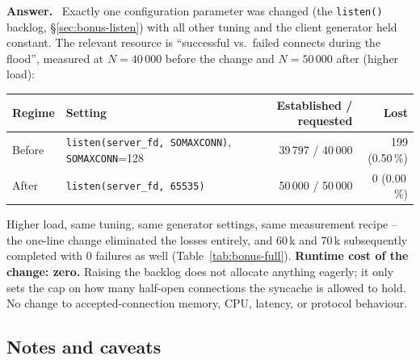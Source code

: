 \documentclass[11pt,a4paper]{article}
\newenvironment{answer}
  {\begin{answerbox}\textbf{\color{accent}Answer.}\ }
  {\end{answerbox}}
\begin{document}
\begin{answer}
Exactly one configuration parameter was changed (the \texttt{listen()}
backlog, \S\ref{sec:bonus-listen}) with all other tuning and the client
generator held constant.  The relevant resource is
``successful vs.\ failed connects during the flood'', measured at $N=40\,000$
before the change and $N=50\,000$ after (higher load):

\begin{center}
\small
\begin{tabular}{@{}llrr@{}}
\toprule
\textbf{Regime} & \textbf{Setting} & \textbf{Established / requested} & \textbf{Lost} \\ \midrule
Before & \texttt{listen(server\_fd, SOMAXCONN)}, \texttt{SOMAXCONN}=128 & 39\,797 / 40\,000 & 199 (0.50\,\%) \\
After  & \texttt{listen(server\_fd, 65535)} & 50\,000 / 50\,000 & 0 (0.00\,\%) \\
\bottomrule
\end{tabular}
\end{center}

Higher load, same tuning, same generator settings, same measurement recipe --
the one-line change eliminated the losses entirely, and 60\,k and 70\,k
subsequently completed with 0 failures as well (Table~\ref{tab:bonus-full}).
\textbf{Runtime cost of the change: zero.}  Raising the backlog does not
allocate anything eagerly; it only sets the cap on how many half-open
connections the syncache is allowed to hold.  No change to accepted-connection
memory, CPU, latency, or protocol behaviour.
\end{answer}

\subsection{Notes and caveats}
\end{document}
